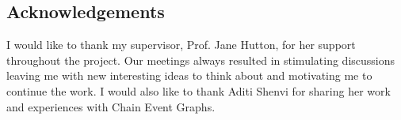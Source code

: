 \documentclass[runningheads]{llncs}
\begin{document}
\subsection*{Acknowledgements}
I would like to thank my supervisor, Prof. Jane Hutton, for her support throughout the project. Our meetings always resulted in stimulating discussions leaving me with new interesting ideas to think about and motivating me to continue the work. I would also like to thank Aditi Shenvi for sharing her work and experiences with Chain Event Graphs. 




%
\newpage


%
\end{document}
